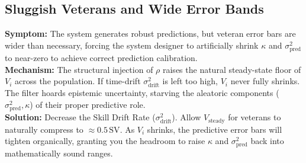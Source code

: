 \documentclass[12pt]{article}
\begin{document}
	\subsection{Sluggish Veterans and Wide Error Bands}
	\textbf{Symptom:} The system generates robust predictions, but veteran error bars are wider than necessary, forcing the system designer to artificially shrink $\kappa$ and $\sigma_{\mathrm{pred}}^2$ to near-zero to achieve correct prediction calibration.\\
	\textbf{Mechanism:} The structural injection of $\rho$ raises the natural steady-state floor of $V_i$ across the population. If time-drift $\sigma_{\mathrm{drift}}^2$ is left too high, $V_i$ never fully shrinks. The filter hoards epistemic uncertainty, starving the aleatoric components ($\sigma_{\mathrm{pred}}^2, \kappa$) of their proper predictive role.\\
	\textbf{Solution:} Decrease the Skill Drift Rate ($\sigma_{\mathrm{drift}}^2$). Allow $V_{\mathrm{steady}}$ for veterans to naturally compress to $\approx 0.5\,\text{SV}$. As $V_i$ shrinks, the predictive error bars will tighten organically, granting you the headroom to raise $\kappa$ and $\sigma_{\mathrm{pred}}^2$ back into mathematically sound ranges.
	
\end{document}
